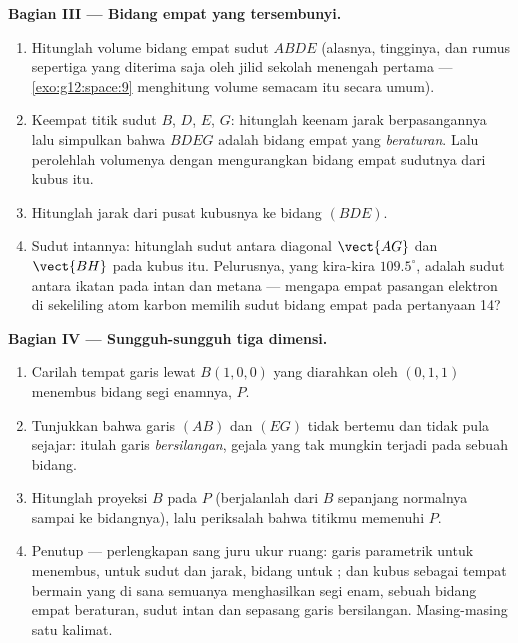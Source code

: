 \begin{problem}
\medskip
\noindent\textbf{Bagian III --- Bidang empat yang tersembunyi.}
\begin{enumerate}[resume]
  \item Hitunglah volume bidang empat sudut $ABDE$
        (alasnya, tingginya, dan rumus sepertiga yang diterima saja
        oleh jilid sekolah menengah pertama --- \cref{exo:g12:space:9}
        menghitung volume semacam itu secara umum).
  \item Keempat titik sudut $B$, $D$, $E$, $G$: hitunglah keenam
        jarak berpasangannya lalu simpulkan bahwa $BDEG$ adalah
        bidang empat yang \emph{beraturan}. Lalu perolehlah volumenya dengan
        mengurangkan bidang empat sudutnya dari kubus itu.
  \item Hitunglah jarak dari pusat kubusnya ke
        bidang $(BDE)$.
  \item Sudut intannya: hitunglah sudut antara
        diagonal $\vect{AG}$ dan $\vect{BH}$ pada kubus itu. Pelurusnya,
        yang kira-kira $109.5^\circ$, adalah sudut antara
        ikatan pada intan dan metana --- mengapa empat
        pasangan elektron di sekeliling atom karbon memilih sudut
        bidang empat pada pertanyaan 14?
\end{enumerate}

\medskip
\noindent\textbf{Bagian IV --- Sungguh-sungguh tiga dimensi.}
\begin{enumerate}[resume]
  \item Carilah tempat garis lewat $B(1,0,0)$ yang diarahkan oleh
        $(0,1,1)$ menembus bidang segi enamnya, $P$.
  \item Tunjukkan bahwa garis $(AB)$ dan $(EG)$ tidak bertemu dan tidak pula
        sejajar: itulah garis \emph{bersilangan}, gejala yang
        tak mungkin terjadi pada sebuah bidang.
  \item Hitunglah proyeksi  $B$ pada $P$
        (berjalanlah dari $B$ sepanjang normalnya sampai ke bidangnya), lalu
        periksalah bahwa titikmu memenuhi  $P$.
  \item Penutup --- perlengkapan sang juru ukur ruang: garis parametrik
        untuk menembus,  untuk sudut dan jarak,
         bidang untuk ; dan kubus sebagai
        tempat bermain yang di sana semuanya menghasilkan segi enam, sebuah
        bidang empat beraturan, sudut intan dan sepasang garis
        bersilangan. Masing-masing satu kalimat.

\end{enumerate}
\end{problem}
